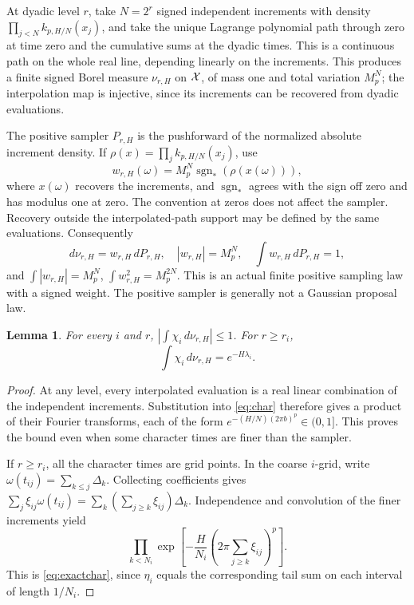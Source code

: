 \documentclass[11pt]{article}
\newtheorem{lemma}[theorem]{Lemma}
\theoremstyle{remark}\newtheorem{remark}[theorem]{Remark}
\begin{document}
At dyadic level $r$, take $N=2^r$ signed independent increments with density $\prod_{j<N}k_{p,H/N}(x_j)$, and take the unique Lagrange polynomial path through zero at time zero and the cumulative sums at the dyadic times. This is a continuous path on the whole real line, depending linearly on the increments. This produces a finite signed Borel measure $\nu_{r,H}$ on $\mathcal X$, of mass one and total variation $M_p^N$; the interpolation map is injective, since its increments can be recovered from dyadic evaluations.

The positive sampler $P_{r,H}$ is the pushforward of the normalized absolute increment density. If $\rho(x)=\prod_j k_{p,H/N}(x_j)$, use
\[
 w_{r,H}(\omega)=M_p^N\operatorname{sgn}_*(\rho(x(\omega))),
\]
where $x(\omega)$ recovers the increments, and $\operatorname{sgn}_*$ agrees with the sign off zero and has modulus one at zero. The convention at zeros does not affect the sampler. Recovery outside the interpolated-path support may be defined by the same evaluations. Consequently
\begin{equation}\label{eq:weights}
 d\nu_{r,H}=w_{r,H}\,dP_{r,H},\quad
 |w_{r,H}|=M_p^N,\quad
 \int w_{r,H}\,dP_{r,H}=1,
\end{equation}
and $\int|w_{r,H}|=M_p^N$, $\int w_{r,H}^2=M_p^{2N}$. This is an actual finite positive sampling law with a signed weight. The positive sampler is generally not a Gaussian proposal law.

\begin{lemma}\label{lem:finitechar}
For every $i$ and $r$, $|\int\chi_i\,d\nu_{r,H}|\le1$. For $r\ge r_i$,
\begin{equation}\label{eq:exactchar}
 \int\chi_i\,d\nu_{r,H}=e^{-H\lambda_i}.
\end{equation}
\end{lemma}
\begin{proof}
At any level, every interpolated evaluation is a real linear combination of the independent increments. Substitution into \eqref{eq:char} therefore gives a product of their Fourier transforms, each of the form $e^{-(H/N)(2\pi b)^p}\in(0,1]$. This proves the bound even when some character times are finer than the sampler.

If $r\ge r_i$, all the character times are grid points. In the coarse $i$-grid, write $\omega(t_{ij})=\sum_{k\le j}\Delta_k$. Collecting coefficients gives $\sum_j\xi_{ij}\omega(t_{ij})=\sum_k(\sum_{j\ge k}\xi_{ij})\Delta_k$. Independence and convolution of the finer increments yield
\[
 \prod_{k<N_i}\exp\left[-\frac{H}{N_i}
 \left(2\pi\sum_{j\ge k}\xi_{ij}\right)^p\right].
\]
This is \eqref{eq:exactchar}, since $\eta_i$ equals the corresponding tail sum on each interval of length $1/N_i$.
\end{proof}
\end{document}
